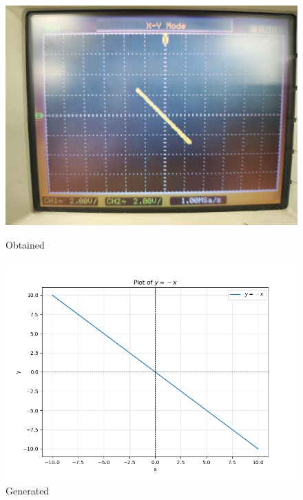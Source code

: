 \documentclass[a4paper,12pt]{article}
\numberwithin{equation}{section} %
\begin{document}
\begin{figure}[htbp]
    \centering
    \begin{minipage}{0.45\textwidth}
        \centering
        \includegraphics[width=\linewidth]{Graphs/Graph4.jpeg}
        \caption{Obtained}
    \end{minipage}
    \hfill
    \begin{minipage}{0.45\textwidth}
        \centering
        \includegraphics[width=\linewidth]{Python plots/lab6.png} 
        \caption{Generated}
    \end{minipage}
\end{figure}\\
\newpage
\end{document}
